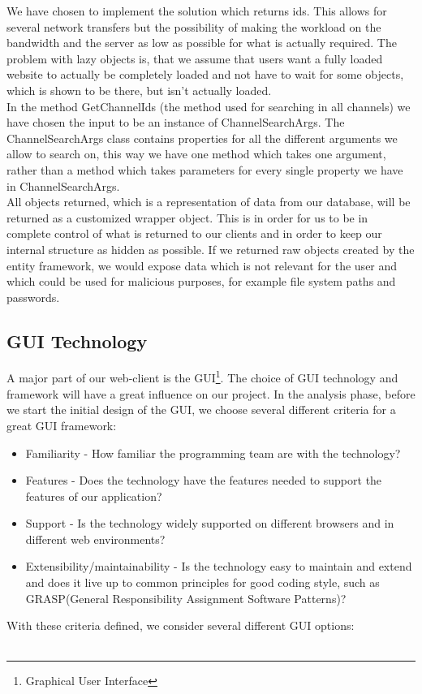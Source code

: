 \documentclass[a4paper,11pt,report]{article}
\begin{document}
We have chosen to implement the solution which returns ids. This allows for several network transfers but the possibility of making the workload on the bandwidth and the server as low as possible for what is actually required. The problem with lazy objects is, that we assume that users want a fully loaded website to actually be completely loaded and not have to wait for some objects, which is shown to be there, but isn't actually loaded. \\
In the method GetChannelIds (the method used for searching in all channels) we have chosen the input to be an instance of ChannelSearchArgs. The ChannelSearchArgs class contains properties for all the different arguments we allow to search on, this way we have one method which takes one argument, rather than a method which takes parameters for every single property we have in ChannelSearchArgs. \\
All objects returned, which is a representation of data from our database, will be returned as a customized wrapper object. This is in order for us to be in complete control of what is returned to our clients and in order to keep our internal structure as hidden as possible. If we returned raw objects created by the entity framework, we would expose data which is not relevant for the user and which could be used for malicious purposes, for example file system paths and passwords.

\subsection{GUI Technology}
A major part of our web-client is the GUI\footnote{Graphical User Interface}. The choice of GUI technology and framework will have a great influence on our project. In the analysis phase, before we start the initial design of the GUI, we choose several different criteria for a great GUI framework:
\begin{itemize}
\item Familiarity - How familiar the programming team are with the technology?
\item Features - Does the technology have the features needed to support the features of our application?
\item Support - Is the technology widely supported on different browsers and in different web environments?
\item Extensibility/maintainability - Is the technology easy to maintain and extend and does it live up to common principles for good coding style, such as GRASP(General Responsibility Assignment Software Patterns)?
\end{itemize}
With these criteria defined, we consider several different GUI options: \\ \\
\end{document}
